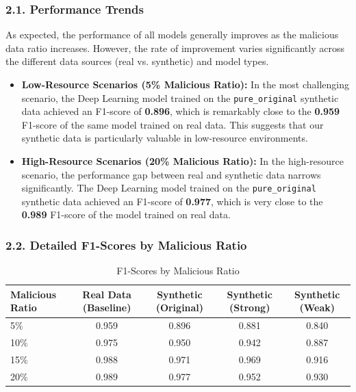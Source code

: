 \documentclass{article}
\begin{document}
\subsubsection*{2.1. Performance Trends}

As expected, the performance of all models generally improves as the malicious data ratio increases. However, the rate of improvement varies significantly across the different data sources (real vs. synthetic) and model types.

\begin{itemize}
    \item \textbf{Low-Resource Scenarios (5\% Malicious Ratio):} In the most challenging scenario, the Deep Learning model trained on the \texttt{pure_original} synthetic data achieved an F1-score of \textbf{0.896}, which is remarkably close to the \textbf{0.959} F1-score of the same model trained on real data. This suggests that our synthetic data is particularly valuable in low-resource environments.
    \item \textbf{High-Resource Scenarios (20\% Malicious Ratio):} In the high-resource scenario, the performance gap between real and synthetic data narrows significantly. The Deep Learning model trained on the \texttt{pure_original} synthetic data achieved an F1-score of \textbf{0.977}, which is very close to the \textbf{0.989} F1-score of the model trained on real data.
\end{itemize}

\subsubsection*{2.2. Detailed F1-Scores by Malicious Ratio}

\begin{table}[h!]
\centering
\begin{tabular}{lcccc}
\toprule
\textbf{Malicious Ratio} & \textbf{Real Data (Baseline)} & \textbf{Synthetic (Original)} & \textbf{Synthetic (Strong)} & \textbf{Synthetic (Weak)} \\
\midrule
5\% & 0.959 & 0.896 & 0.881 & 0.840 \\
10\% & 0.975 & 0.950 & 0.942 & 0.887 \\
15\% & 0.988 & 0.971 & 0.969 & 0.916 \\
20\% & 0.989 & 0.977 & 0.952 & 0.930 \\
\bottomrule
\end{tabular}
\caption{F1-Scores by Malicious Ratio}
\label{tab:f1_scores}
\end{table}
\end{document}
